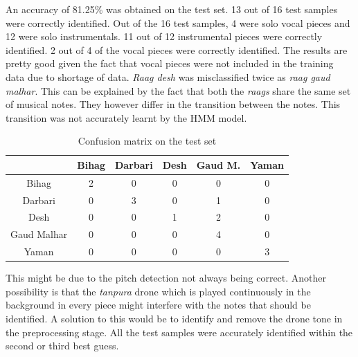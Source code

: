 \documentclass[letterpaper, 10 pt, conference]{ieeeconf}  %
\begin{document}
An accuracy of 81.25\% was obtained on the test set. 13 out of 16 test samples were correctly identified. Out of the 16 test samples, 4 were solo vocal pieces and 12 were solo instrumentals. 11 out of 12 instrumental pieces were correctly identified. 2 out of 4 of the vocal pieces were correctly identified. The results are pretty good given the fact that vocal pieces were not included in the training data due to shortage of data. \textit{Raag desh} was misclassified twice as \textit{raag gaud malhar}. This can be explained by the fact that both the \textit{raags} share the same set of musical notes. They however differ in the transition between the notes. This transition was not accurately learnt by the HMM model. 

\begin{table}[h]
\caption{Confusion matrix on the test set}
\label{confusion}
\centering
\begin{tabular}{|c|c|c|c|c|c|}
\hline
            & Bihag & Darbari & Desh & Gaud M. & Yaman \\ \hline
Bihag       & 2     & 0       & 0    & 0       & 0     \\ \hline
Darbari     & 0     & 3       & 0    & 1       & 0     \\ \hline
Desh        & 0     & 0       & 1    & 2       & 0     \\ \hline
Gaud Malhar & 0     & 0       & 0    & 4       & 0     \\ \hline
Yaman       & 0     & 0       & 0    & 0       & 3     \\ \hline
\end{tabular}
\end{table}


This might be due to the pitch detection not always being correct. Another possibility is that the \textit{tanpura} drone which is played continuously in the background  in every piece might interfere with the notes that should be identified. A solution to this would be to identify and remove the drone tone in the preprocessing stage. 
All the test samples were accurately identified within the second or third best guess. 


   
\end{document}
